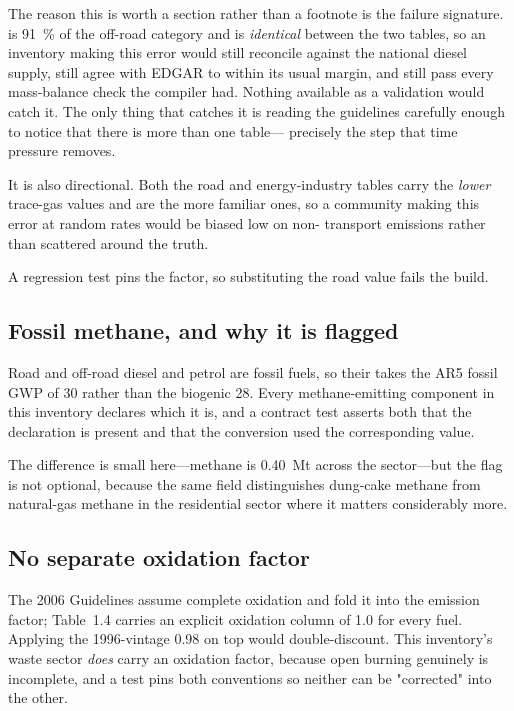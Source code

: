 The reason this is worth a section rather than a footnote is the failure signature. \COtwo{}
is \SI{91}{\percent} of the off-road category and is \emph{identical} between the two tables,
so an inventory making this error would still reconcile against the national diesel supply,
still agree with EDGAR to within its usual margin, and still pass every mass-balance check the
compiler had. Nothing available as a validation would catch it. The only thing that catches it
is reading the guidelines carefully enough to notice that there is more than one table---
precisely the step that time pressure removes.

It is also directional. Both the road and energy-industry tables carry the \emph{lower} trace-gas
values and are the more familiar ones, so a community making this error at random rates would
be biased low on non-\COtwo{} transport emissions rather than scattered around the truth.

A regression test pins the factor, so substituting the road value fails the build.

\subsection{Fossil methane, and why it is flagged}

Road and off-road diesel and petrol are fossil fuels, so their \CHfour{} takes the AR5 fossil
GWP of \num{30} rather than the biogenic \num{28}. Every methane-emitting component in this
inventory declares which it is, and a contract test asserts both that the declaration is
present and that the \COe{} conversion used the corresponding value.

The difference is small here---methane is \SI{0.40}{\mega\tonne} \COe{} across the
sector---but the flag is not optional, because the same field distinguishes dung-cake methane
from natural-gas methane in the residential sector where it matters considerably more.

\subsection{No separate oxidation factor}

The 2006 Guidelines assume complete oxidation and fold it into the emission factor;
Table~1.4 carries an explicit oxidation column of \num{1.0} for every fuel. Applying the
1996-vintage \num{0.98} on top would double-discount. This inventory's waste sector
\emph{does} carry an oxidation factor, because open burning genuinely is incomplete, and a
test pins both conventions so neither can be "corrected" into the other.
